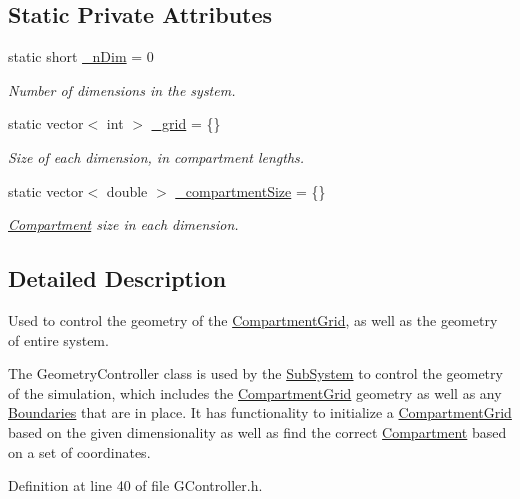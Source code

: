 \subsection*{Static Private Attributes}
\begin{DoxyCompactItemize}
\item 
static short \hyperlink{classGController_af3276bac24eb8b3b1bca31007b941c0f}{\+\_\+n\+Dim} = 0
\begin{DoxyCompactList}\small\item\em Number of dimensions in the system. \end{DoxyCompactList}\item 
static vector$<$ int $>$ \hyperlink{classGController_a2134b6522abe94d25206060b9684d265}{\+\_\+grid} = \{\}
\begin{DoxyCompactList}\small\item\em Size of each dimension, in compartment lengths. \end{DoxyCompactList}\item 
static vector$<$ double $>$ \hyperlink{classGController_a26bdd8b8d1667decda74bedf7bf25800}{\+\_\+compartment\+Size} = \{\}
\begin{DoxyCompactList}\small\item\em \hyperlink{classCompartment}{Compartment} size in each dimension. \end{DoxyCompactList}\end{DoxyCompactItemize}


\subsection{Detailed Description}
Used to control the geometry of the \hyperlink{classCompartmentGrid}{Compartment\+Grid}, as well as the geometry of entire system. 

The Geometry\+Controller class is used by the \hyperlink{classSubSystem}{Sub\+System} to control the geometry of the simulation, which includes the \hyperlink{classCompartmentGrid}{Compartment\+Grid} geometry as well as any \hyperlink{classBoundary}{Boundaries} that are in place. It has functionality to initialize a \hyperlink{classCompartmentGrid}{Compartment\+Grid} based on the given dimensionality as well as find the correct \hyperlink{classCompartment}{Compartment} based on a set of coordinates. 

Definition at line 40 of file G\+Controller.\+h.



